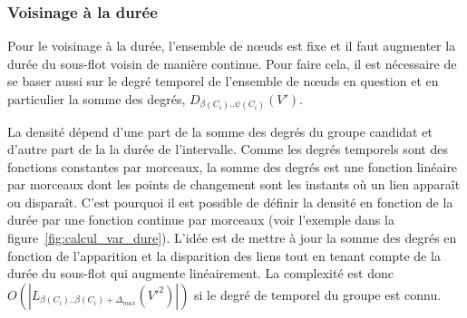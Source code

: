 \subsubsection{Voisinage à la durée}
Pour le voisinage à la durée, l'ensemble de n\oe{}uds est fixe et il faut augmenter la durée du sous-flot voisin de manière continue.
Pour faire cela, il est nécessaire de se baser aussi sur le degré temporel de l'ensemble de n\oe{}uds en question et en particulier la somme des degrés, $D_{\beta(C_i)..\psi(C_i)}(V')$.

La densité dépend d'une part de la somme des degrés du groupe candidat et d'autre part de la la durée de l'intervalle.
Comme les degrés temporels sont des fonctions constantes par morceaux, la somme des degrés est une fonction linéaire par morceaux dont les points de changement sont les instants où un lien apparaît ou disparaît.
C'est pourquoi il est possible de définir la densité en fonction de la durée par une fonction continue par morceaux (voir l'exemple dans la figure~\ref{fig:calcul_var_dure}).
L'idée est de mettre à jour la somme des degrés en fonction de l'apparition et la disparition des liens tout en tenant compte de la durée du sous-flot qui augmente linéairement.
La complexité est donc $O(|L_{\beta(C_i)..\beta(C_i)+\Delta_{max}}(V'^2)|)$ si le degré de temporel du groupe est connu.

